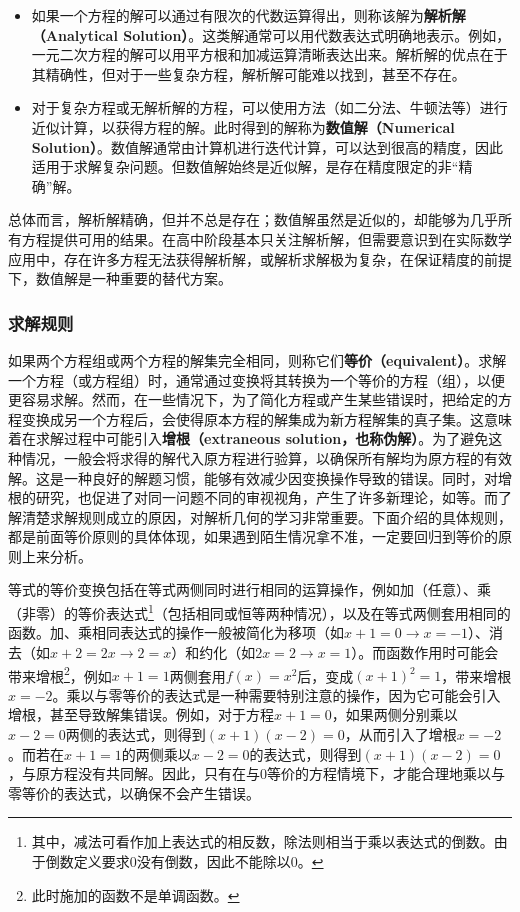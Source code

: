 \begin{itemize}
\item 如果一个方程的解可以通过有限次的代数运算得出，则称该解为\textbf{解析解（Analytical Solution）}。这类解通常可以用代数表达式明确地表示。例如，一元二次方程的解可以用平方根和加减运算清晰表达出来。解析解的优点在于其精确性，但对于一些复杂方程，解析解可能难以找到，甚至不存在。
\item 对于复杂方程或无解析解的方程，可以使用方法（如二分法、牛顿法等）进行近似计算，以获得方程的解。此时得到的解称为\textbf{数值解（Numerical Solution）}。数值解通常由计算机进行迭代计算，可以达到很高的精度，因此适用于求解复杂问题。但数值解始终是近似解，是存在精度限定的非“精确”解。
\end{itemize}

总体而言，解析解精确，但并不总是存在；数值解虽然是近似的，却能够为几乎所有方程提供可用的结果。在高中阶段基本只关注解析解，但需要意识到在实际数学应用中，存在许多方程无法获得解析解，或解析求解极为复杂，在保证精度的前提下，数值解是一种重要的替代方案。

\subsubsection{求解规则}

如果两个方程组或两个方程的解集完全相同，则称它们\textbf{等价（equivalent）}。求解一个方程（或方程组）时，通常通过变换将其转换为一个等价的方程（组），以便更容易求解。然而，在一些情况下，为了简化方程或产生某些错误时，把给定的方程变换成另一个方程后，会使得原本方程的解集成为新方程解集的真子集。这意味着在求解过程中可能引入\textbf{增根（extraneous solution，也称伪解）}。为了避免这种情况，一般会将求得的解代入原方程进行验算，以确保所有解均为原方程的有效解。这是一种良好的解题习惯，能够有效减少因变换操作导致的错误。同时，对增根的研究，也促进了对同一问题不同的审视视角，产生了许多新理论，如等。而了解清楚求解规则成立的原因，对解析几何的学习非常重要。下面介绍的具体规则，都是前面等价原则的具体体现，如果遇到陌生情况拿不准，一定要回归到等价的原则上来分析。

等式的等价变换包括在等式两侧同时进行相同的运算操作，例如加（任意）、乘（非零）的等价表达式\footnote{其中，减法可看作加上表达式的相反数，除法则相当于乘以表达式的倒数。由于倒数定义要求$0$没有倒数，因此不能除以$0$。}（包括相同或恒等两种情况），以及在等式两侧套用相同的函数。加、乘相同表达式的操作一般被简化为移项（如$x+1=0\to x=-1$）、消去（如$x+2=2x\to 2=x$）和约化（如$2x=2\to x=1$）。而函数作用时可能会带来增根\footnote{此时施加的函数不是单调函数。}，例如$x+1=1$两侧套用$f(x)=x^2$后，变成$(x+1)^2=1$，带来增根$x=-2$。乘以与零等价的表达式是一种需要特别注意的操作，因为它可能会引入增根，甚至导致解集错误。例如，对于方程$x+1=0$，如果两侧分别乘以$x-2=0$两侧的表达式，则得到$(x+1)(x-2)=0$，从而引入了增根$x=-2$。而若在$x+1=1$的两侧乘以$x-2=0$的表达式，则得到$(x+1)(x-2)=0$，与原方程没有共同解。因此，只有在与$0$等价的方程情境下，才能合理地乘以与零等价的表达式，以确保不会产生错误。

